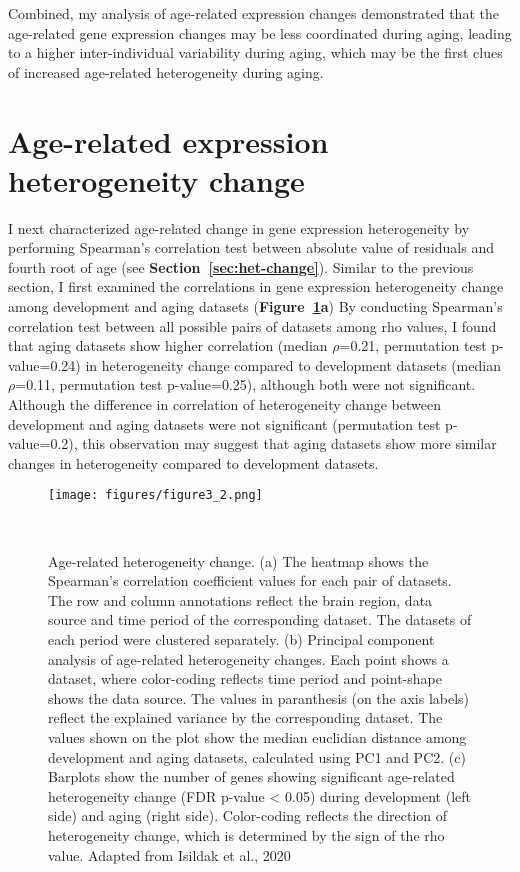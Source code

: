 Combined, my analysis of age-related expression changes demonstrated that the age-related gene expression changes may be less coordinated during aging,
leading to a higher inter-individual variability during aging, which may be the first clues of increased age-related heterogeneity during aging.

\section{Age-related expression heterogeneity change}
I next characterized age-related change in gene expression heterogeneity by performing Spearman's correlation test between absolute value of residuals and fourth root of age (see \textbf{Section~\ref{sec:het-change}}).
Similar to the previous section, I first examined the correlations in gene expression heterogeneity change among development and aging datasets (\textbf{Figure~\ref{fig:fig3.2}a})
By conducting  Spearman's correlation test between all possible pairs of datasets among rho values, 
I found that aging datasets show higher correlation (median $\rho$=0.21, permutation test p-value=0.24) in heterogeneity change
compared to development datasets (median $\rho$=0.11, permutation test p-value=0.25), although both were not significant.
Although the difference in correlation of heterogeneity change between development and aging datasets were not significant (permutation test p-value=0.2),
this observation may suggest that aging datasets show more similar changes in heterogeneity compared to development datasets.

\begin{figure}[h]
    \centering
    \texttt{[image: figures/figure3\_2.png]}
    \caption{Age-related heterogeneity change. 
    (a) The heatmap shows the Spearman's correlation coefficient values for each pair of datasets.
    The row and column annotations reflect the brain region, data source and time period of the corresponding dataset.
    The datasets of each period were clustered separately.
    (b) Principal component analysis of age-related heterogeneity changes. Each point shows a dataset, 
    where color-coding reflects time period and point-shape shows the data source. 
    The values in paranthesis (on the axis labels) reflect the explained variance by the corresponding dataset.
    The values shown on the plot show the median euclidian distance among development and aging datasets, 
    calculated using PC1 and PC2.
    (c) Barplots show the number of genes showing significant age-related heterogeneity change (FDR p-value < 0.05) during development (left side) and aging (right side).
    Color-coding reflects the direction of heterogeneity change, which is determined by the sign of the rho value.
    Adapted from Isildak et al., 2020
    }~\label{fig:fig3.2}
\end{figure}

